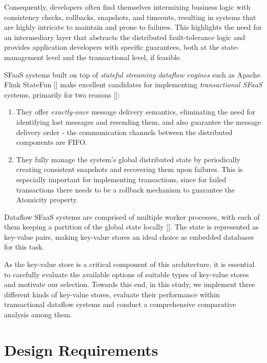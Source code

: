 Consequently, developers often find themselves intermixing business logic with consistency checks, rollbacks, snapshots, and timeouts, resulting in systems that are highly intricate to maintain and prone to failures. This highlights the need for an intermediary layer that abstracts the distributed fault-tolerance logic and provides application developers with specific guarantees, both at the state-management level and the transactional level, if feasible.

SFaaS systems built on top of \textit{stateful streaming dataflow engines} such as Apache Flink StateFun [\cite{apache-flink}] make excellent candidates for implementing \textit{transactional SFaaS} systems, primarily for two reasons [\cite{transactions-serverless-functions-leveraging-stateful-dataflows}]:

\begin{enumerate}
    \item They offer \textit{exactly-once} message delivery semantics, eliminating the need for identifying lost messages and resending them, and also guarantee the message delivery order - the communication channels between the distributed components are FIFO.

    \item They fully manage the system's global distributed state by periodically creating consistent snapshots and recovering them upon failures. This is especially important for implementing transactions, since for failed transactions there needs to be a rollback mechanism to guarantee the Atomicity property.
\end{enumerate}

Dataflow SFaaS systems are comprised of multiple worker processes, with each of them keeping a partition of the global state locally [\cite{apache-flink}]. The state is represented as key-value pairs, making key-value stores an ideal choice as embedded databases for this task.

As the key-value store is a critical component of this architecture, it is essential to carefully evaluate the available options of suitable types of key-value stores and motivate our selection. Towards this end, in this study, we implement three different kinds of key-value stores, evaluate their performance within transactional dataflow systems and conduct a comprehensive comparative analysis among them.

\section{Design Requirements}
\label{design-requirements}

